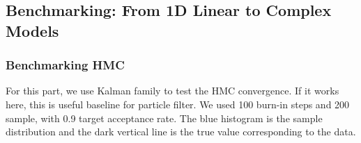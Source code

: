 \documentclass{article}
\begin{document}





\subsection{Benchmarking: From 1D Linear to Complex Models}

\subsubsection{Benchmarking HMC}
For this part, we use Kalman family to test the HMC convergence. If it works here, this is useful baseline for particle filter. We used 100 burn-in steps and 200 sample, with 0.9 target acceptance rate. The blue histogram is the sample distribution and the dark vertical line is the true value corresponding to the data.

\end{document}
